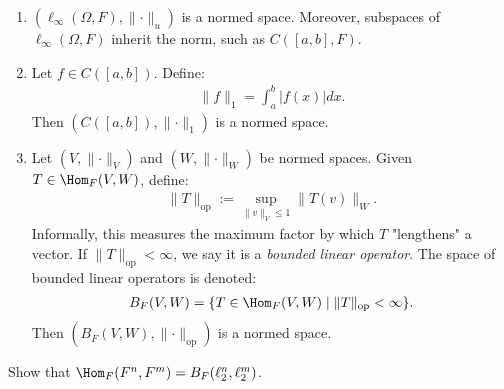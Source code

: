     \begin{example}
        \phantom{a}
        \begin{enumerate}[label = (\arabic*)]
            \item $\left(\ell_\infty(\Omega,F),\lVert \cdot \rVert _u\right)$ is a normed space. Moreover, subspaces of $\ell_\infty(\Omega,F)$ inherit the norm, such as $C([a,b],F)$.
            \item Let $f \in C([a,b])$. Define:
                \begin{equation*}
                \begin{split}
                    \lVert f \rVert _1 = \int_{a}^b |f(x)|dx.
                \end{split}
                \end{equation*}           
            Then $(C([a,b]),\lVert \cdot \rVert _1)$ is a normed space.
            \item Let $(V,\lVert \cdot \rVert _V)$ and $(W,\lVert \cdot \rVert _W)$ be normed spaces. Given $T \in \Hom_F(V,W)$, define:
                \begin{equation*}
                \begin{split}
                    \lVert T \rVert _{\text{op}} := \sup_{\lVert v \rVert _V \leq 1} \lVert T(v) \rVert _W.
                \end{split}
                \end{equation*}
            Informally, this measures the maximum factor by which $T$ "lengthens" a vector. If $\lVert T \rVert _\text{op} < \infty$, we say it is a \textit{bounded linear operator}. The space of bounded linear operators is denoted:
                \begin{equation*}
                \begin{split}
                    B_F(V,W) = \{T \in \Hom_F(V,W) \mid \lVert T \rVert _\text{op} < \infty \}.
                \end{split}
                \end{equation*}
            Then $(B_F(V,W),\lVert \cdot \rVert _\text{op})$ is a normed space.
        \end{enumerate}
    \end{example}

    \begin{exercise}\label{exercise:hom-b}
        Show that $\Hom_F(F^n,F^m) = B_F(\ell_2^n,\ell_2^m)$.
    \end{exercise}
        
